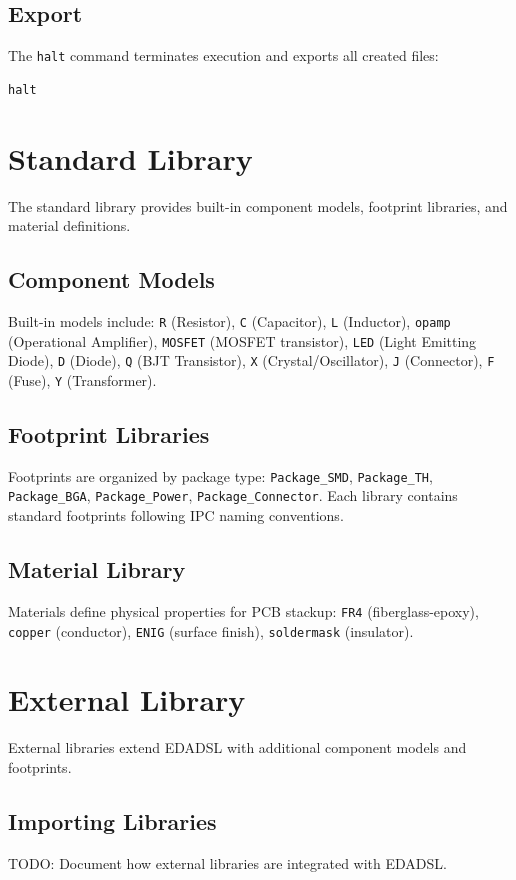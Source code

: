 \section{Export}
The \texttt{halt} command terminates execution and exports all created files:
\begin{verbatim}
halt
\end{verbatim}


\chapter{Standard Library}
The standard library provides built-in component models, footprint libraries, and material definitions.

\section{Component Models}
Built-in models include: \texttt{R} (Resistor), \texttt{C} (Capacitor), \texttt{L} (Inductor), \texttt{opamp} (Operational Amplifier), \texttt{MOSFET} (MOSFET transistor), \texttt{LED} (Light Emitting Diode), \texttt{D} (Diode), \texttt{Q} (BJT Transistor), \texttt{X} (Crystal/Oscillator), \texttt{J} (Connector), \texttt{F} (Fuse), \texttt{Y} (Transformer).

\section{Footprint Libraries}
Footprints are organized by package type: \texttt{Package\_SMD}, \texttt{Package\_TH}, \texttt{Package\_BGA}, \texttt{Package\_Power}, \texttt{Package\_Connector}. Each library contains standard footprints following IPC naming conventions.

\section{Material Library}
Materials define physical properties for PCB stackup: \texttt{FR4} (fiberglass-epoxy), \texttt{copper} (conductor), \texttt{ENIG} (surface finish), \texttt{soldermask} (insulator).


\chapter{External Library}
External libraries extend EDADSL with additional component models and footprints.

\section{Importing Libraries}
TODO: Document how external libraries are integrated with EDADSL.

